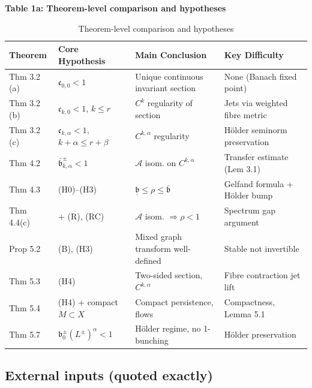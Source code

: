 \documentclass[11pt,a4paper]{article}
\theoremstyle{plain}
\theoremstyle{definition}
\theoremstyle{remark}
\numberwithin{equation}{section}
\numberwithin{figure}{section}
\begin{document}
\textbf{Table 1a: Theorem-level comparison and hypotheses}

\begin{table}[h]
\centering
\begin{tabularx}{\textwidth}{l X X X}
\toprule
Theorem & Core Hypothesis & Main Conclusion & Key Difficulty\\
\midrule
Thm 3.2 (a) & $\mathfrak c_{0,0}<1$ & Unique continuous invariant section & None (Banach fixed point)\\
Thm 3.2 (b) & $\mathfrak c_{k,0}<1$, $k\le r$ & $C^k$ regularity of section & Jets via weighted fibre metric\\
Thm 3.2 (c) & $\mathfrak c_{k,\alpha}<1$, $k+\alpha\le r+\beta$ & $C^{k,\alpha}$ regularity & Hölder seminorm preservation\\
Thm 4.2 & $\bar{\mathfrak b}^\pm_{k,\alpha}<1$ & $\mathcal A$ isom. on $C^{k,\alpha}$ & Transfer estimate (Lem 3.1)\\
Thm 4.3 & (H0)–(H3) & $\underline{\mathfrak b}\le\rho\le\bar{\mathfrak b}$ & Gelfand formula + Hölder bump\\
Thm 4.4(c) & + (R), (RC) & $\mathcal A$ isom. $\Rightarrow\rho<1$ & Spectrum gap argument\\
Prop 5.2 & (B), (H3) & Mixed graph transform well-defined & Stable not invertible\\
Thm 5.3 & (H4) & Two-sided section, $C^{k,\alpha}$ & Fibre contraction jet lift\\
Thm 5.4 & (H4) + compact $M\subset X$ & Compact persistence, flows & Compactness, Lemma 5.1\\
Thm 5.7 & $\mathfrak b_0^\pm(L^\pm)^\alpha<1$ & Hölder regime, no 1-bunching & Hölder preservation\\
\bottomrule
\end{tabularx}
\caption{Theorem-level comparison and hypotheses}
\label{tab:table1a}
\end{table}

\subsection{External inputs (quoted exactly)}
\end{document}
